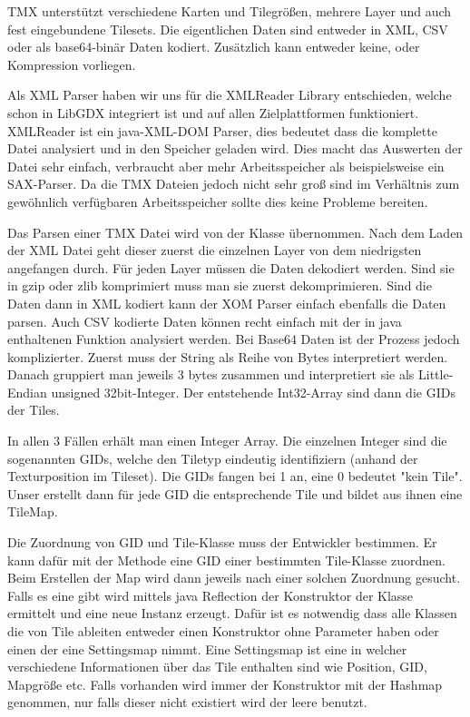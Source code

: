 TMX unterstützt verschiedene Karten und Tilegrößen, mehrere Layer und auch fest eingebundene Tilesets. Die eigentlichen Daten sind entweder in XML, CSV oder als base64-binär Daten kodiert. Zusätzlich kann entweder keine,  oder  Kompression vorliegen\cite{TMXDOC}.

Als XML Parser haben wir uns für die XMLReader Library entschieden, welche schon in LibGDX integriert ist und auf allen Zielplattformen funktioniert. XMLReader ist ein java-XML-DOM Parser, dies bedeutet dass die komplette Datei analysiert und in den Speicher geladen wird. Dies macht das Auswerten der Datei sehr einfach, verbraucht aber mehr Arbeitsspeicher als beispielsweise ein SAX-Parser. Da die TMX Dateien jedoch nicht sehr groß sind im Verhältnis zum gewöhnlich verfügbaren Arbeitsspeicher sollte dies keine Probleme bereiten.

Das Parsen einer TMX Datei wird von der Klasse  übernommen. Nach dem Laden der XML Datei geht dieser zuerst die einzelnen Layer von dem niedrigsten angefangen durch. Für jeden Layer müssen die Daten dekodiert werden. Sind sie in gzip oder zlib komprimiert muss man sie zuerst dekomprimieren. Sind die Daten dann in XML kodiert kann der XOM Parser einfach ebenfalls die Daten parsen. Auch CSV kodierte Daten können recht einfach mit der in java enthaltenen  Funktion analysiert werden.
Bei Base64 Daten ist der Prozess jedoch komplizierter. Zuerst muss der String als Reihe von Bytes interpretiert werden. Danach gruppiert man jeweils 3 bytes zusammen und interpretiert sie als Little-Endian unsigned 32bit-Integer. Der entstehende Int32-Array sind dann die GIDs der Tiles.

In allen 3 Fällen erhält man einen Integer Array. Die einzelnen Integer sind die sogenannten GIDs, welche den Tiletyp eindeutig identifiziern (anhand der Texturposition im Tileset).
Die GIDs fangen bei 1 an, eine 0 bedeutet "kein Tile". Unser  erstellt dann für jede GID die entsprechende Tile und bildet aus ihnen eine TileMap.

Die Zuordnung von GID und Tile-Klasse muss der Entwickler bestimmen. Er kann dafür mit der Methode  eine GID einer bestimmten Tile-Klasse zuordnen. Beim Erstellen der Map wird dann jeweils nach einer solchen Zuordnung gesucht. Falls es eine gibt wird mittels java Reflection der Konstruktor der Klasse ermittelt und eine neue Instanz erzeugt. Dafür ist es notwendig dass alle Klassen die von Tile ableiten entweder einen Konstruktor ohne Parameter haben oder einen der eine Settingsmap nimmt. Eine Settingsmap ist eine  in welcher verschiedene Informationen über das Tile enthalten sind wie Position, GID, Mapgröße etc. Falls vorhanden wird immer der Konstruktor mit der Hashmap genommen, nur falls dieser nicht existiert wird der leere benutzt.

